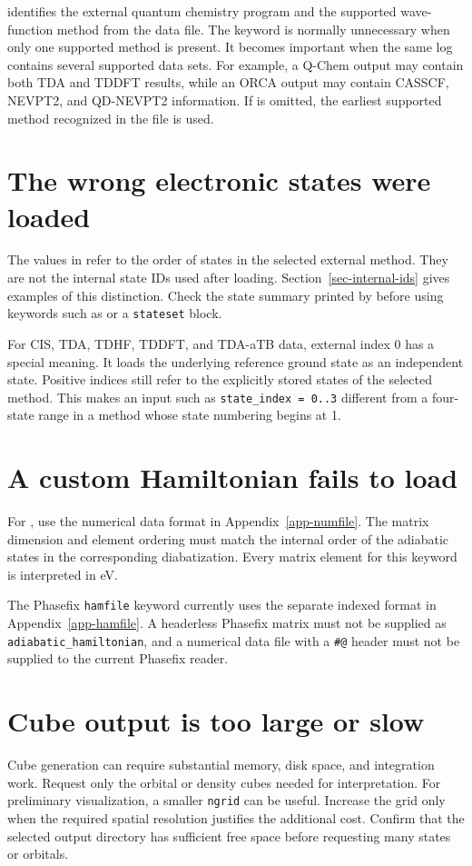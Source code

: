 \progname{} identifies the external quantum chemistry program and the supported wave-function method from the data file. The  keyword is normally unnecessary when only one supported method is present. It becomes important when the same log contains several supported data sets. For example, a Q-Chem output may contain both TDA and TDDFT results, while an ORCA output may contain CASSCF, NEVPT2, and QD-NEVPT2 information. If  is omitted, the earliest supported method recognized in the file is used.

\section{The wrong electronic states were loaded}
The values in  refer to the order of states in the selected external method. They are not the internal state IDs used after loading. Section~\ref{sec-internal-ids} gives examples of this distinction. Check the state summary printed by \progname{} before using keywords such as  or a \texttt{stateset} block.

For CIS, TDA, TDHF, TDDFT, and TDA-aTB data, external index 0 has a special meaning. It loads the underlying reference ground state as an independent state. Positive indices still refer to the explicitly stored states of the selected method. This makes an input such as \texttt{state\_index = 0..3} different from a four-state range in a method whose state numbering begins at 1.

\section{A custom Hamiltonian fails to load}
For , use the numerical data format in Appendix~\ref{app-numfile}. The matrix dimension and element ordering must match the internal order of the adiabatic states in the corresponding diabatization. Every matrix element for this keyword is interpreted in eV.

The Phasefix \texttt{hamfile} keyword currently uses the separate indexed format in Appendix~\ref{app-hamfile}. A headerless Phasefix matrix must not be supplied as \texttt{adiabatic\_hamiltonian}, and a numerical data file with a \texttt{\#@} header must not be supplied to the current Phasefix reader.

\section{Cube output is too large or slow}
Cube generation can require substantial memory, disk space, and integration work. Request only the orbital or density cubes needed for interpretation. For preliminary visualization, a smaller \texttt{ngrid} can be useful. Increase the grid only when the required spatial resolution justifies the additional cost. Confirm that the selected output directory has sufficient free space before requesting many states or orbitals.
